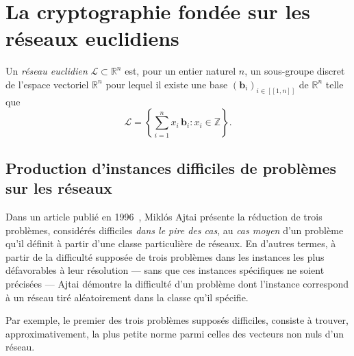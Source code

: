 
\section{La cryptographie fondée sur les réseaux euclidiens} %
\label{sec:reseaux}




Un \emph{réseau euclidien} $\mathcal{L} \subset \mathbb{R}^n$ est, pour un entier naturel $n$, un sous-groupe discret de l’espace vectoriel $\mathbb{R}^n$ pour lequel il existe une base $(\mathbf{b}_i)_{i\in[\![1, n]\!]}$ de $\mathbb{R}^n$ telle que
\[
\mathcal{L} =\left\{ \sum^n_{i=1} x_i\,\mathbf{b}_i : x_i \in \mathbb Z\right\}\text{.}
\]


\subsection{Production d’instances difficiles de problèmes sur les réseaux}

Dans un article publié en 1996~\cite{STOC:Ajtai96}, Miklós Ajtai présente la réduction de trois problèmes, considérés
difficiles \emph{dans le pire des cas}, au \emph{cas moyen} d’un problème qu’il définit à partir
d’une classe particulière de réseaux.
En d’autres termes, à partir de la difficulté supposée de trois problèmes dans les instances les
plus défavorables à leur résolution --- sans que ces instances spécifiques ne soient précisées ---
Ajtai démontre la difficulté d’un problème dont l’instance correspond à un réseau tiré aléatoirement
dans la classe qu’il spécifie.

Par exemple, le premier des trois problèmes supposés difficiles, consiste à trouver,
approximativement, la plus petite norme parmi celles des vecteurs non nuls d’un réseau.

